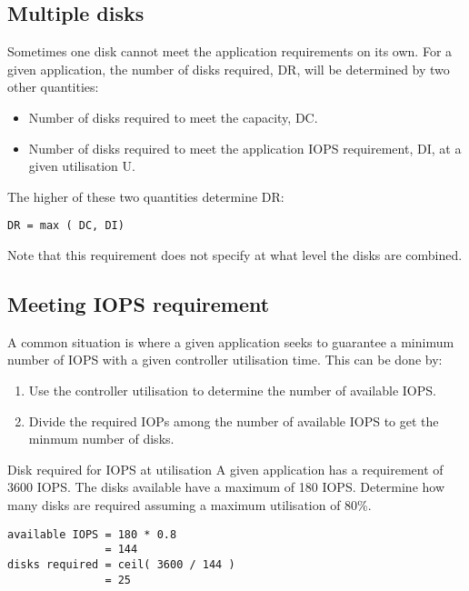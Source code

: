 \documentclass[slides]{pgnotes}
\begin{document}
\subsection{Multiple disks}\label{multiple-disks}

Sometimes one disk cannot meet the application requirements on its own.
For a given application, the number of disks required, DR, will be
determined by two other quantities:

\begin{itemize}
\item
  Number of disks required to meet the capacity, DC.
\item
  Number of disks required to meet the application IOPS requirement, DI,
  at a given utilisation U.
\end{itemize}

The higher of these two quantities determine DR:

\begin{verbatim}
DR = max ( DC, DI) 
\end{verbatim}

Note that this requirement does not specify at what level the disks are
combined.

\subsection{Meeting IOPS requirement}\label{meeting-iops-requirement}

A common situation is where a given application seeks to guarantee a
minimum number of IOPS with a given controller utilisation time. This
can be done by:

\begin{enumerate}
\item
  Use the controller utilisation to determine the number of available
  IOPS.
\item
  Divide the required IOPs among the number of available IOPS to get the
  minmum number of disks.
\end{enumerate}

\begin{example}{Disk required for IOPS at utilisation}
  A given application has a requirement of 3600 IOPS.
  The disks available have a maximum of 180 IOPS.
  Determine how many disks are required assuming a maximum utilisation of 80\%.
\tcblower
\begin{verbatim}
available IOPS = 180 * 0.8
               = 144
disks required = ceil( 3600 / 144 )
               = 25
\end{verbatim}
\end{example}
\end{document}
